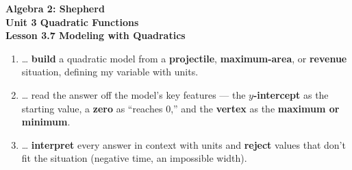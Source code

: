 \documentclass[10pt]{article}
\begin{document}
\vspace{-0.8in}

\begin{center}
  {\color{white}\textbf{\LARGE Algebra 2: Shepherd}}\\[4pt]
  {\color{forestmid}\large\textbf{Unit 3 \quad Quadratic Functions}}\\[6pt]
  {\color{white}\textbf{\large Lesson 3.7 \quad Modeling with Quadratics}}
\end{center}

\vspace{0.22in}
\namedateperiod
\vspace{0.18in}

\begin{learningtargetbox}
\small
\begin{enumerate}[leftmargin=1.5em, itemsep=5pt]
  \item \ldots{} \textbf{build} a quadratic model from a \textbf{projectile}, \textbf{maximum-area}, or \textbf{revenue} situation, defining my variable with units.
  \item \ldots{} read the answer off the model's key features --- the \textbf{$y$-intercept} as the starting value, a \textbf{zero} as ``reaches $0$,'' and the \textbf{vertex} as the \textbf{maximum or minimum}.
  \item \ldots{} \textbf{interpret} every answer in context with units and \textbf{reject} values that don't fit the situation (negative time, an impossible width).
\end{enumerate}
\end{learningtargetbox}

\vspace{0.14in}
\end{document}
